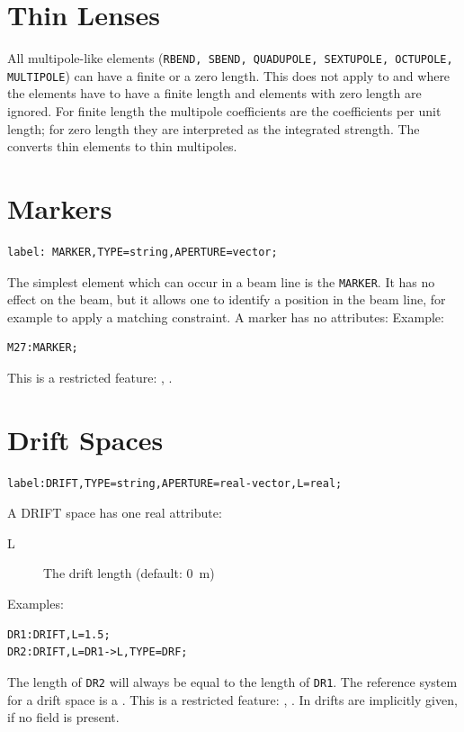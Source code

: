 \section{Thin Lenses}
\label{sec:thin}
All multipole-like elements
(\texttt{RBEND, SBEND, QUADUPOLE, SEXTUPOLE, OCTUPOLE, MULTIPOLE})
can have a finite or a zero length. This does not apply to \opalt and \opalcycl where the elements have to have a finite length and elements with zero length are ignored.
For finite length the multipole coefficients are the coefficients per
unit length;
for zero length they are interpreted as the integrated strength.
The  converts thin elements to
thin multipoles.

\section{Markers}
\label{sec:marker}
\begin{verbatim}
label: MARKER,TYPE=string,APERTURE=vector;
\end{verbatim}
The simplest element which can occur in a beam line is the \texttt{MARKER}.
It has no effect on the beam,
but it allows one to identify a position in the beam line,
for example to apply a matching constraint.
A marker has no attributes:
\noindent Example:
\begin{verbatim}
M27:MARKER;
\end{verbatim}
This is a restricted feature: \noopalt, \noopalcycl .

\section{Drift Spaces}
\label{sec:drift}
\begin{verbatim}
label:DRIFT,TYPE=string,APERTURE=real-vector,L=real;
\end{verbatim}
A DRIFT space has one real attribute:
\begin{description}
\item[L]
  The drift length (default: 0~m)
\end{description}
\noindent Examples:
\begin{verbatim}
DR1:DRIFT,L=1.5;
DR2:DRIFT,L=DR1->L,TYPE=DRF;
\end{verbatim}
The length of \texttt{DR2} will always be equal to the length of \texttt{DR1}.
The reference system for a drift space is a 
.
This is a restricted feature: \noopalt, \noopalcycl . In \opalt drifts are implicitly given, if no field is present.
